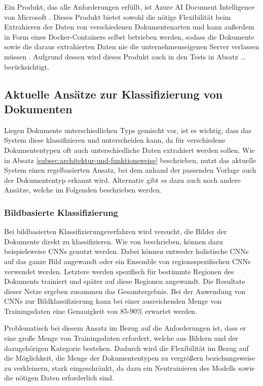 Ein Produkt, das alle Anforderungen erfüllt, ist Azure AI Document Intelligence von Microsoft \cite{microsoft_azureai_documentintelligence}. Dieses Produkt bietet sowohl die nötige Flexibilität beim Extrahieren der Daten von verschiedenen Dokumentenarten und kann außerdem in Form eines Docker-Containers selbst betrieben werden, sodass die Dokumente sowie die daraus extrahierten Daten nie die unternehmenseigenen Server verlassen müssen \cite{microsoft_azureai_documentintelligence_containers}. Aufgrund dessen wird dieses Produkt auch in den Tests in Absatz ... berücksichtigt.

\subsection{Aktuelle Ansätze zur Klassifizierung von Dokumenten}
\label{subsec:aktuelle-ansätze-zur-klassifizierung-von-dokumenten}

Liegen Dokumente unterschiedlichen Typs gemischt vor, ist es wichtig, dass das System diese klassifizieren und unterscheiden kann, da für verschiedene Dokumententypen oft auch unterschiedliche Daten extrahiert werden sollen. Wie in Absatz \ref{subsec:architektur-und-funktionsweise} beschrieben, nutzt das aktuelle System einen regelbasierten Ansatz, bei dem anhand der passenden Vorlage auch der Dokumententyp erkannt wird. Alternativ gibt es dazu auch noch andere Ansätze, welche im Folgenden beschrieben werden.

\subsubsection{Bildbasierte Klassifizierung}
\label{subsubsec:bild-basierte-klassifizieurng}

Bei bildbasierten Klassifizierungsverfahren wird versucht, die Bilder der Dokumente direkt zu klassifizieren. Wie von \textcite{HarleyAdamW2015EoDC} beschrieben, können dazu beispielsweise CNNs genutzt werden. Dabei können entweder holistische CNNs auf das ganze Bild angewandt oder ein Ensemble von regionsspezifischen CNNs verwendet werden. Letztere werden spezifisch für bestimmte Regionen des Dokuments trainiert und später auf diese Regionen angewandt. Die Resultate dieser Netze ergeben zusammen das Gesamtergebnis. Bei der Anwendung von CNNs zur Bildklassifizierung kann bei einer ausreichenden Menge von Trainingsdaten eine Genauigkeit von 85-90\% erwartet werden.

Problematisch bei diesem Ansatz im Bezug auf die Anforderungen ist, dass er eine große Menge von Trainingsdaten erfordert, welche aus Bildern und der dazugehörigen Kategorie bestehen. Dadurch wird die Flexibilität im Bezug auf die Möglichkeit, die Menge der Dokumententypen zu vergrößern beziehungsweise zu verkleinern, stark eingeschränkt, da dazu ein Neutrainieren des Modells sowie die nötigen Daten erforderlich sind.

